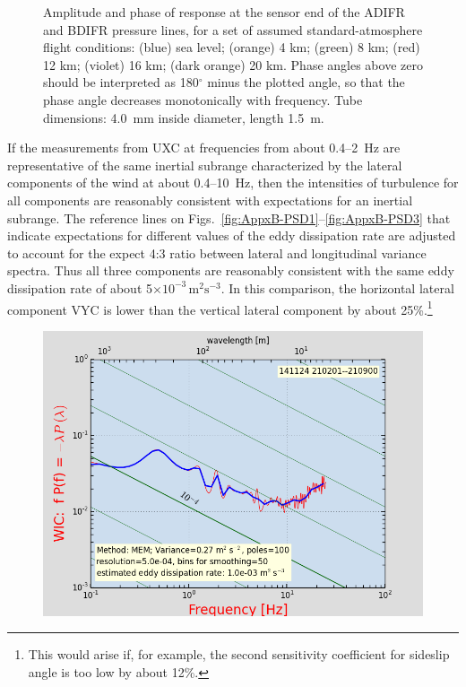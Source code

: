 \documentclass[12pt,twoside,english]{article}\usepackage[]{graphicx}\usepackage[]{color}
\let\OrgIndex\index
\renewcommand*{\index}[1]{\OrgIndex{#1}}
\begin{document}
{{\begin{appendices}
\begin{figure}
\protect\caption[Amplitude ratio and phase for transmission through the pressure lines for ADIFR and BDIFR.]{\label{fig:AppxB-DHL2}Amplitude and phase of response at the sensor end of the ADIFR and BDIFR pressure lines, for a set of assumed standard-atmosphere flight conditions: (blue) sea level; (orange) 4 km; (green) 8 km; (red) 12 km; (violet) 16 km; (dark orange) 20 km. Phase angles above zero should be interpreted as 180$^{\circ}$ minus the plotted angle, so that the phase angle decreases monotonically with frequency. Tube dimensions: 4.0~mm inside diameter, length 1.5~m.} 
\end{figure}


If the measurements from UXC at frequencies from about 0.4--2~Hz are representative of the same inertial subrange characterized by the lateral components of the wind at about 0.4--10~Hz, then the intensities of turbulence for all components are reasonably consistent with expectations for an inertial subrange. The reference lines on Figs.~\ref{fig:AppxB-PSD1}--\ref{fig:AppxB-PSD3} that indicate expectations for different values of the eddy dissipation rate are adjusted to account for the expect 4:3 ratio between lateral and longitudinal variance spectra. Thus all three components are reasonably consistent with the same eddy dissipation rate of about 5$\times10^{-3}\,\mathrm{m}^{2}\mathrm{s}^{-3}$. In this comparison, the horizontal lateral component VYC is lower than the vertical lateral component by about 25\%.\footnote{This would arise if, for example, the second sensitivity coefficient for sideslip angle is too low by about 12\%.}





\begin{figure}
\noindent \begin{centering}
\includegraphics[height=0.4\textheight]{SpecialGraphics/PSD5.png}  
\par\end{centering}


\end{figure}
\end{appendices}}}
\end{document}
